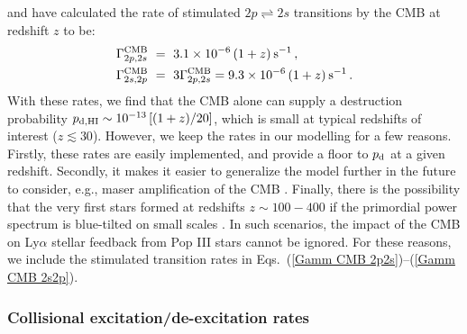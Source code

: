 \documentclass[fleqn,usenatbib]{mnras}
\begin{document}
\cite{Hirata2006} and \cite{Dijkstra2016} have calculated the rate of stimulated $2p \rightleftharpoons 2s$ transitions by the CMB at redshift $z$ to be:
\begin{align}
    \Gamma_{2p,2s}^{\rm CMB} ~&=~  3.1 \times 10^{-6} \, (1+z) \hspace{2 pt} \rm s^{-1} \, \label{Gamm CMB 2p2s}, \\ 
    \Gamma_{2s,2p}^{\rm CMB} ~&=~ 3 \Gamma_{2p,2s}^{\rm CMB} = 9.3  \times 10^{-6} \, (1+z) \hspace{2 pt} \rm s^{-1} \, \label{Gamm CMB 2s2p}.
\end{align}
With these rates, we find that the CMB alone can supply a destruction probability $p_{\rm d,HI} \sim 10^{-13} \, [(1+z)/20]$, which is small at typical redshifts of interest ($z \lesssim 30$). However, we keep the rates in our modelling for a few reasons. Firstly, these rates are easily implemented, and provide a floor to $p_{\rm d}$ at a given redshift. Secondly, it makes it easier to generalize the model further in the future to consider, e.g., maser amplification of the CMB \citep[see][and the discussion in Sec. \ref{neglected processes for pd}]{Dijkstra2016}. Finally, there is the possibility that the very first stars formed at redshifts $z \sim 100-400$ if the primordial power spectrum is blue-tilted on small scales \citep{Hirano2015_bluetilt, Hirano2024, Ito2024}. In such scenarios, the impact of the CMB on Ly$\alpha$ stellar feedback from Pop III stars cannot be ignored. For these reasons, we include the stimulated transition rates in Eqs.~(\ref{Gamm CMB 2p2s})--(\ref{Gamm CMB 2s2p}).


\subsubsection{Collisional excitation/de-excitation rates}
\label{Subsection CE/CDE rates}
\end{document}
